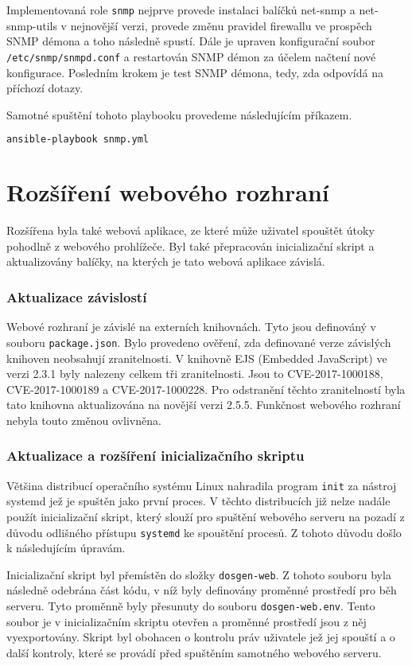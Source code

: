 Implementovaná role \texttt{snmp} nejprve provede instalaci balíčků net-snmp a net-snmp-utils v nejnovější verzi, provede změnu pravidel firewallu ve prospěch SNMP démona a toho následně spustí. Dále je upraven konfigurační soubor \texttt{/etc/snmp/snmpd.conf} a restartován SNMP démon za účelem načtení nové konfigurace. Posledním krokem je test SNMP démona, tedy, zda odpovídá na příchozí dotazy.

Samotné spuštění tohoto playbooku provedeme následujícím příkazem.

\begin{lstlisting}[language=bash]
ansible-playbook snmp.yml
\end{lstlisting}

\section{Rozšíření webového rozhraní}
Rozšířena byla také webová aplikace, ze které může uživatel spouštět útoky pohodlně z webového prohlížeče. Byl také přepracován inicializační skript a aktualizovány balíčky, na kterých je tato webová aplikace závislá.

\subsubsection{Aktualizace závislostí}
Webové rozhraní je závislé na externích knihovnách. Tyto jsou definováný v souboru \texttt{package.json}. Bylo provedeno ověření, zda definované verze závislých knihoven neobsahují zranitelnosti. V knihovně EJS (Embedded JavaScript) ve verzi 2.3.1 byly nalezeny celkem tři zranitelnosti. Jsou to CVE-2017-1000188, CVE-2017-1000189 a CVE-2017-1000228. Pro odstranění těchto zranitelností byla tato knihovna aktualizována na novější verzi 2.5.5. Funkčnost webového rozhraní nebyla touto změnou ovlivněna.

\subsubsection{Aktualizace a rozšíření inicializačního skriptu}
Většina distribucí operačního systému Linux nahradila program \texttt{init} za nástroj systemd jež je spuštěn jako první proces. V těchto distribucích již nelze nadále použít inicializační skript, který slouží pro spuštění webového serveru na pozadí z důvodu odlišného přístupu \texttt{systemd} ke spouštění procesů. Z tohoto důvodu došlo k následujícím úpravám.

Inicializační skript byl přemístěn do složky \texttt{dosgen-web}. Z tohoto souboru byla následně odebrána část kódu, v níž byly definovány proměnné prostředí pro běh serveru. Tyto proměnně byly přesunuty do souboru \texttt{dosgen-web.env}. Tento soubor je v inicializačním skriptu otevřen a proměnné prostředí jsou z něj vyexportovány. Skript byl obohacen o kontrolu práv uživatele jež jej spouští a o další kontroly, které se provádí před spuštěním samotného webového serveru.

